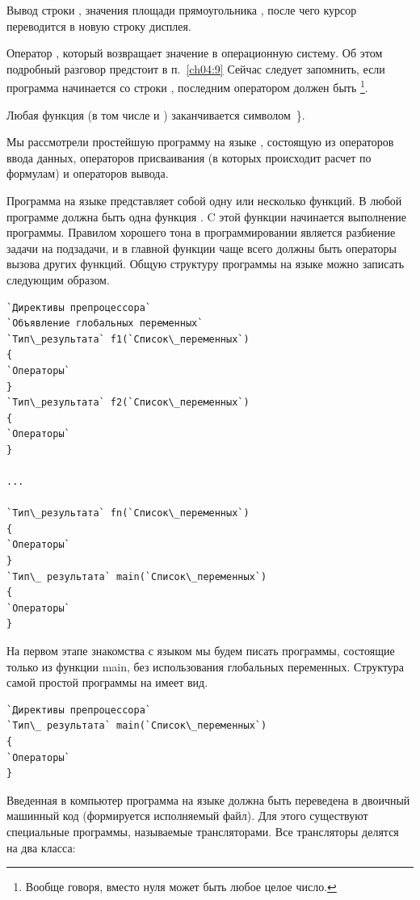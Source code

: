  Вывод строки , значения площади
прямоугольника , после чего курсор переводится в новую строку дисплея.

 Оператор , который возвращает значение в
операционную систему. Об этом подробный разговор предстоит в п.~\ref{ch04:9} %
Сейчас следует запомнить, если программа
начинается со строки , последним оператором должен быть
\footnote{Вообще говоря, вместо нуля может быть любое целое число.}.

 Любая функция (в том числе и ) заканчивается символом~\}.

Мы рассмотрели простейшую программу на языке , состоящую из операторов ввода 
данных, операторов присваивания (в
которых происходит расчет по формулам) и операторов вывода. 

Программа на языке  представляет собой одну или несколько функций. 
В любой программе 
должна быть одна функция . C этой функции начинается 
выполнение программы. Правилом хорошего
тона в программировании является разбиение задачи на подзадачи, и в главной функции 
чаще всего должны быть операторы
вызова других функций. Общую структуру программы на 
языке  можно записать следующим
образом. 

\begin{lstlisting}
`Директивы препроцессора`
`Объявление глобальных переменных`
`Тип\_результата` f1(`Список\_переменных`)
{
`Операторы`
}
`Тип\_результата` f2(`Список\_переменных`)
{
`Операторы`
}

...

`Тип\_результата` fn(`Список\_переменных`)
{
`Операторы`
}
`Тип\_ результата` main(`Список\_переменных`)
{
`Операторы`
}
\end{lstlisting}

На первом этапе знакомства с языком мы будем писать программы, состоящие только из функции main, без использования
глобальных переменных. Структура самой  простой программы на  имеет вид.
\begin{lstlisting}
`Директивы препроцессора`
`Тип\_ результата` main(`Список\_переменных`)
{
`Операторы`
}
\end{lstlisting}

Введенная в компьютер программа на языке  должна быть переведена в двоичный машинный код (формируется
исполняемый файл). Для этого существуют специальные программы, называемые трансляторами. Все
трансляторы  делятся на два класса:

